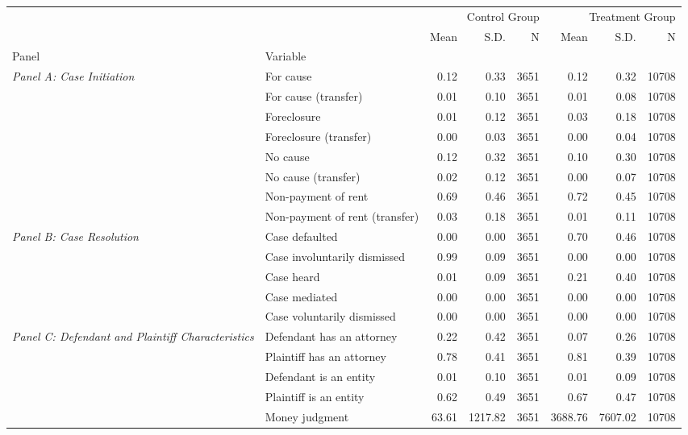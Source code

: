 \begin{table}[H]
\begin{tabular}{llrrrrrr}
\toprule
 &  & \multicolumn{3}{r}{Control Group} & \multicolumn{3}{r}{Treatment Group} \\
 &  & Mean & S.D. & N & Mean & S.D. & N \\
Panel & Variable &  &  &  &  &  &  \\
\midrule
\multirow[c]{8}{4cm}{\textit{Panel A: Case Initiation}} & For cause & 0.12 & 0.33 & 3651 & 0.12 & 0.32 & 10708 \\
 & For cause (transfer) & 0.01 & 0.10 & 3651 & 0.01 & 0.08 & 10708 \\
 & Foreclosure & 0.01 & 0.12 & 3651 & 0.03 & 0.18 & 10708 \\
 & Foreclosure (transfer) & 0.00 & 0.03 & 3651 & 0.00 & 0.04 & 10708 \\
 & No cause & 0.12 & 0.32 & 3651 & 0.10 & 0.30 & 10708 \\
 & No cause (transfer) & 0.02 & 0.12 & 3651 & 0.00 & 0.07 & 10708 \\
 & Non-payment of rent & 0.69 & 0.46 & 3651 & 0.72 & 0.45 & 10708 \\
 & Non-payment of rent (transfer) & 0.03 & 0.18 & 3651 & 0.01 & 0.11 & 10708 \\
\cline{1-8}
\multirow[c]{5}{4cm}{\textit{Panel B: Case Resolution}} & Case defaulted & 0.00 & 0.00 & 3651 & 0.70 & 0.46 & 10708 \\
 & Case involuntarily dismissed & 0.99 & 0.09 & 3651 & 0.00 & 0.00 & 10708 \\
 & Case heard & 0.01 & 0.09 & 3651 & 0.21 & 0.40 & 10708 \\
 & Case mediated & 0.00 & 0.00 & 3651 & 0.00 & 0.00 & 10708 \\
 & Case voluntarily dismissed & 0.00 & 0.00 & 3651 & 0.00 & 0.00 & 10708 \\
\cline{1-8}
\multirow[c]{5}{4cm}{\textit{Panel C: Defendant and Plaintiff Characteristics}} & Defendant has an attorney & 0.22 & 0.42 & 3651 & 0.07 & 0.26 & 10708 \\
 & Plaintiff has an attorney & 0.78 & 0.41 & 3651 & 0.81 & 0.39 & 10708 \\
 & Defendant is an entity & 0.01 & 0.10 & 3651 & 0.01 & 0.09 & 10708 \\
 & Plaintiff is an entity & 0.62 & 0.49 & 3651 & 0.67 & 0.47 & 10708 \\
 & Money judgment & 63.61 & 1217.82 & 3651 & 3688.76 & 7607.02 & 10708 \\

\end{tabular}
\end{table}

